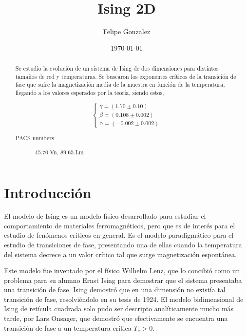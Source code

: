 \documentclass[%
 reprint,
 amsmath,amssymb,
 aps,
]{revtex4-1}
\begin{document}

\title{Ising 2D}

\author{Felipe Gonzalez}


\date{\today}

\begin{abstract}
Se estudio la evoluci\'on de un sistema de Ising de dos dimensiones para
distintos tama\~nos de red y temperaturas. Se buscaron los exponentes cr\'iticos
de la transici\'on de fase que sufre la magnetizaci\'on media de la muestra en
funci\'on de la temperatura, llegando a los valores esperados por la teor\'ia,
siendo estos,

$$
\left \{
  \begin{matrix}
    \gamma = (1.70 \pm 0.10) \\
    \beta = (0.108 \pm 0.002) \\
    \alpha = (-0.002 \pm 0.002)
  \end{matrix}
\right.
$$


\begin{description}
\item[PACS numbers]
45.70.Vn, 89.65.Lm
\end{description}
\end{abstract}


\maketitle

\section{Introducci\'on}

El modelo de Ising es un modelo f\'isico desarrollado para estudiar el
comportamiento de materiales ferromagnéticos, pero que es de inter\'es para el
estudio de fen\'omenos cr\'iticos en general. Es el modelo paradigm\'atico para
el estudio de transiciones de fase, presentando una de ellas cuando la
temperatura del sistema decrece a un valor cr\'itico tal que surge
magnetizaci\'on espont\'anea.

Este modelo fue inventado por el f\'isico Wilhelm Lenz, que lo concibió
como un problema para su alumno Ernst Ising para demostrar que el sistema
presentaba una transici\'on de fase. Ising demostró que en una dimensión
no existía tal transici\'on de fase, resolviéndolo en su tesis de 1924. El modelo
bidimensional de Ising de retícula cuadrada solo pudo ser descripto
analíticamente mucho más tarde, por Lars Onsager, que demostró que
efectivamente se encuentra una transici\'on de fase a un temperatura cr\'itica
$T_c > 0$\cite{Onsager}.
\end{document}
